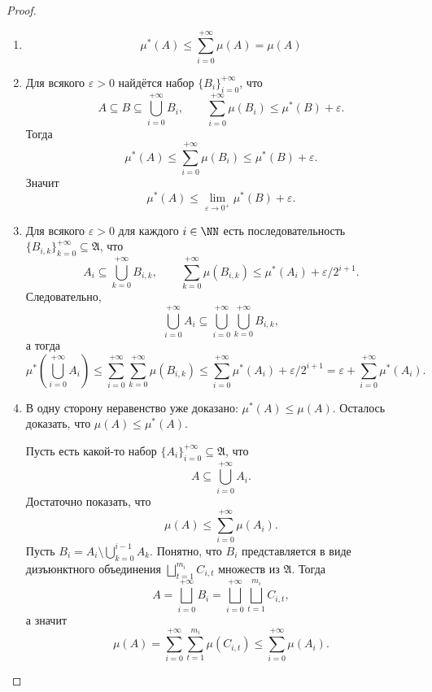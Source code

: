 \documentclass[12pt,a4paper]{article}
\begin{document}
    \begin{proof}
        \begin{enumerate}
            \item \[\mu^*(A) \leqslant \sum_{i=0}^{+\infty} \mu(A) = \mu(A)\]
            \item Для всякого $\varepsilon > 0$ найдётся набор $\{B_i\}_{i=0}^{+\infty}$, что
                \[
                    A \subseteq B \subseteq \bigcup_{i=0}^{+\infty} B_i,
                    \qquad
                    \sum_{i=0}^{+\infty} \mu(B_i) \leqslant \mu^*(B) + \varepsilon.
                \]
                Тогда
                \[\mu^*(A) \leqslant \sum_{i=0}^{+\infty} \mu(B_i) \leqslant \mu^*(B) + \varepsilon.\]
                Значит
                \[\mu^*(A) \leqslant \lim_{\varepsilon \to 0^+} \mu^*(B) + \varepsilon.\]
            \item Для всякого $\varepsilon > 0$ для каждого $i \in \NN$ есть последовательность $\{B_{i, k}\}_{k=0}^{+\infty} \subseteq \mathfrak{A}$, что
                \[
                    A_i \subseteq \bigcup_{k=0}^{+\infty} B_{i, k},
                    \qquad
                    \sum_{k=0}^{+\infty} \mu(B_{i, k}) \leqslant \mu^*(A_i) + \varepsilon/2^{i+1}.
                \]
                Следовательно,
                \[
                    \bigcup_{i=0}^{+\infty} A_i \subseteq \bigcup_{i=0}^{+\infty} \bigcup_{k=0}^{+\infty} B_{i,k},
                \]
                а тогда
                \[
                    \mu^*\left(\bigcup_{i=0}^{+\infty} A_i\right)
                    \leqslant \sum_{i=0}^{+\infty} \sum_{k=0}^{+\infty} \mu(B_{i,k})
                    \leqslant \sum_{i=0}^{+\infty} \mu^*(A_i) + \varepsilon/2^{i+1}
                    = \varepsilon + \sum_{i=0}^{+\infty} \mu^*(A_i).
                \]
            \item В одну сторону неравенство уже доказано: $\mu^*(A) \leqslant \mu(A)$. Осталось доказать, что $\mu(A) \leqslant \mu^*(A)$.

                Пусть есть какой-то набор $\{A_i\}_{i=0}^{+\infty} \subseteq \mathfrak{A}$, что
                \[A \subseteq \bigcup_{i=0}^{+\infty} A_i.\]
                Достаточно показать, что
                \[\mu(A) \leqslant \sum_{i=0}^{+\infty} \mu(A_i).\]
                Пусть $B_i = A_i \setminus \bigcup_{k=0}^{i-1} A_k$. Понятно, что $B_i$ представляется в виде дизъюнктного объединения $\bigsqcup_{t=1}^{m_i} C_{i, t}$ множеств из $\mathfrak{A}$. Тогда
                \[A = \bigsqcup_{i=0}^{+\infty} B_i = \bigsqcup_{i=0}^{+\infty} \bigsqcup_{t=1}^{m_i} C_{i, t},\]
                а значит
                \[\mu(A) = \sum_{i=0}^{+\infty} \sum_{t=1}^{m_i} \mu(C_{i, t}) \leqslant \sum_{i=0}^{+\infty} \mu(A_i).\]
        \end{enumerate}
    \end{proof}
\end{document}
